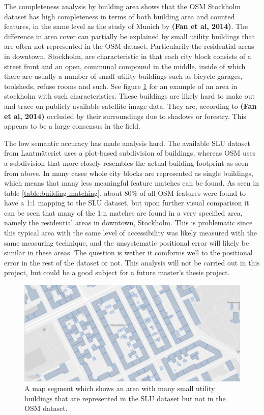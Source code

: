 \documentclass{kththesis}
\begin{document}
The completeness analysis by building area shows that the OSM Stockholm dataset has high completeness in terms of both building area and counted features, in the same level as the study of Munich by \textbf{(Fan et al, 2014)}.
The difference in area cover can partially be explained by small utility buildings that are often not represented in the OSM dataset.
Particularily the residential areas in downtown, Stockholm, are characteristic in that each city block consists of a street front and an open, communal compound in the middle, inside of which there are usually a number of small utility buildings such as bicycle garages, toolsheds, refuse rooms and such.
See figure \ref{fig:osm-slu-map-utility-buildings} for an example of an area in stockholm with such characteristics.
These buildings are likely hard to make out and trace on publicly available satellite image data.
They are, according to \textbf{(Fan et al, 2014)} occluded by their surroundings due to shadows or forestry.
This appears to be a large consensus in the field.

The low semantic accuracy has made analysis hard.
The available SLU dataset from Lantmäteriet uses a plot-based subdivision of buildings, whereas OSM uses a subdivision that more closely resembles the actual building footprint as seen from above.
In many cases whole city blocks are represented as single buildings, which means that many less meaningful feature matches can be found.
As seen in table \ref{table:building-matching}, about 80\% of all OSM features were found to have a 1:1 mapping to the SLU dataset, but upon further visual comparison it can be seen that many of the 1:n matches are found in a very specified area, namely the residential areas in downtown, Stockholm.
This is problematic since this typical area with the same level of accessibility was likely measured with the same measuring technique, and the unsystematic positional error will likely be similar in these areas.
The question is wether it comforms well to the positional error in the rest of the dataset or not.
This analysis will not be carried out in this project, but could be a good subject for a future master's thesis project.

\begin{figure}[H]
    \centering
    \includegraphics[width=\textwidth,height=0.5\textheight,keepaspectratio]{img_map_utility_buildings}
    \caption{A map segment which shows an area with many small utility buildings that are represented in the SLU dataset but not in the OSM dataset.}
    \label{fig:osm-slu-map-utility-buildings}
\end{figure}
\end{document}
